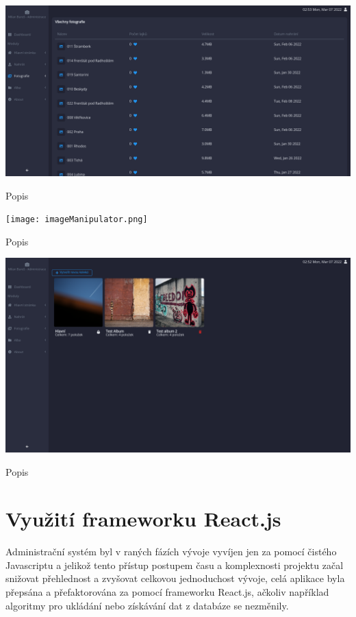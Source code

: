 \documentclass[12pt,a4paper]{report}
\begin{document}
  \vspace*{0.5cm}
  \noindent\includegraphics[width=\linewidth]{allPhotos.png}
  \begin{center}
    Popis
  \end{center}
  \vspace*{0.5cm}

  \vspace*{0.5cm}
  \noindent\texttt{[image: imageManipulator.png]}
  \begin{center}
    Popis
  \end{center}
  \vspace*{0.5cm}

  \vspace*{0.5cm}
  \noindent\includegraphics[width=\linewidth]{albums.png}
  \begin{center}
    Popis
  \end{center}
  \vspace*{0.5cm}

  \section{Využití frameworku React.js}
  Administrační systém byl v raných fázích vývoje vyvíjen jen za pomocí čistého Javascriptu a
  jelikož tento přístup postupem času a komplexnosti projektu začal snižovat přehlednost a zvyšovat 
  celkovou jednoduchost vývoje, celá aplikace byla přepsána a přefaktorována za pomocí 
  frameworku React.js, ačkoliv například algoritmy pro ukládání nebo získávání dat z databáze se nezměnily.
  
\end{document}
